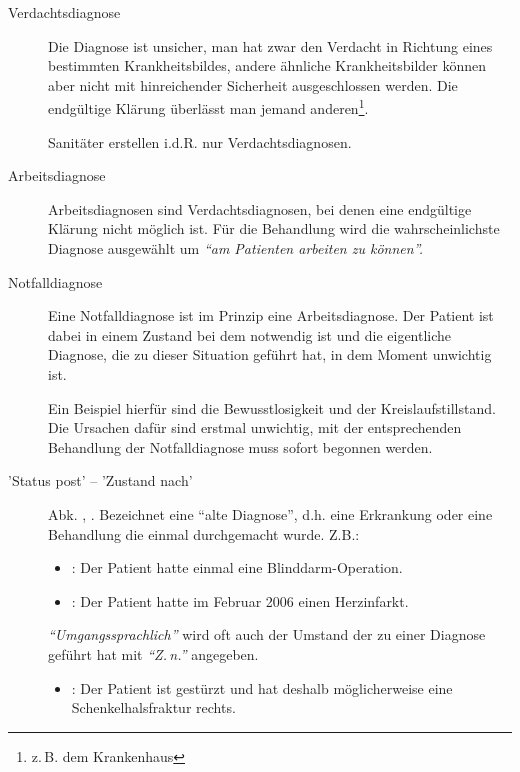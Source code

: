 \begin{description}
    \item[Verdachtsdiagnose]  Die
    Diagnose ist unsicher, man hat zwar den Verdacht in Richtung  eines
    bestimmten Krankheitsbildes, andere ähnliche Krankheitsbilder können  aber
    nicht mit hinreichender Sicherheit ausgeschlossen werden. Die endgültige 
    Klärung überlässt man jemand anderen\footnote{z.\,B. dem Krankenhaus}. \par 
    Sanitäter erstellen i.d.R. nur Verdachtsdiagnosen.
     
    \item[Arbeitsdiagnose] 
    Arbeitsdiagnosen sind Verdachtsdiagnosen, bei denen eine endgültige Klärung
    nicht  möglich ist. Für die Behandlung wird die wahrscheinlichste Diagnose 
    ausgewählt um \emph{``am Patienten arbeiten zu können''.}
    \item[Notfalldiagnose]  Eine
    Notfalldiagnose ist im Prinzip eine Arbeitsdiagnose. Der Patient ist dabei 
    in einem Zustand bei dem  notwendig ist und die 
    eigentliche Diagnose, die zu dieser Situation geführt hat, in dem Moment 
    unwichtig ist. \par Ein Beispiel hierfür sind die Bewusstlosigkeit und der
    Kreislaufstillstand. Die Ursachen dafür sind erstmal unwichtig, mit der
    entsprechenden Behandlung der Notfalldiagnose muss sofort begonnen werden.
    \item['Status post' -- 'Zustand nach']
     Abk. , . 
    Bezeichnet eine ``alte Diagnose'', d.h. eine Erkrankung oder eine Behandlung die einmal durchgemacht wurde. Z.B.:
    \begin{itemize}
        \item {}: Der Patient
        hatte einmal eine Blinddarm-Operation.
        \item {}: Der Patient
        hatte im Februar 2006 einen Herzinfarkt.
    \end{itemize}
    \emph{``Umgangssprachlich''} wird oft auch der Umstand der zu einer
    Diagnose geführt hat mit \emph{``Z.\,n.''} angegeben. 
    \begin{itemize}
        \item {}: Der
        Patient ist gestürzt und hat deshalb möglicherweise eine
        Schenkelhalsfraktur rechts.
    \end{itemize}
\end{description}

